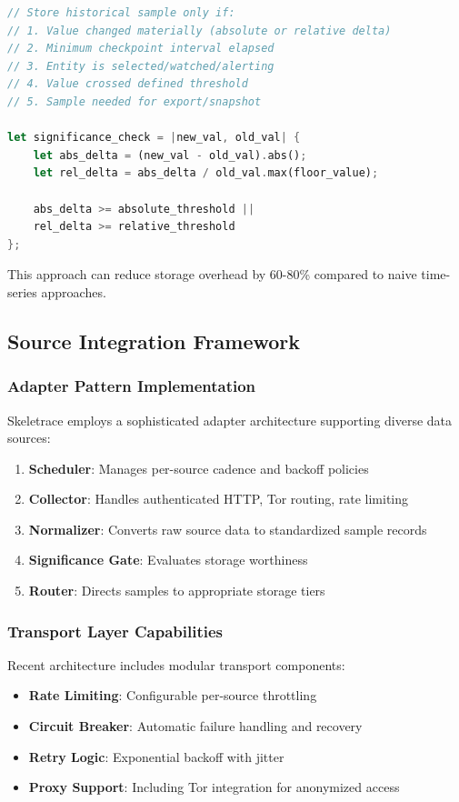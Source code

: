 \documentclass[12pt,a4paper]{article}
\begin{document}
\begin{lstlisting}[language=Rust,caption=Significance Evaluation Logic]
// Store historical sample only if:
// 1. Value changed materially (absolute or relative delta)
// 2. Minimum checkpoint interval elapsed  
// 3. Entity is selected/watched/alerting
// 4. Value crossed defined threshold
// 5. Sample needed for export/snapshot

let significance_check = |new_val, old_val| {
    let abs_delta = (new_val - old_val).abs();
    let rel_delta = abs_delta / old_val.max(floor_value);
    
    abs_delta >= absolute_threshold || 
    rel_delta >= relative_threshold
};
\end{lstlisting}

This approach can reduce storage overhead by 60-80\% compared to naive time-series approaches.

\subsection{Source Integration Framework}

\subsubsection{Adapter Pattern Implementation}
Skeletrace employs a sophisticated adapter architecture supporting diverse data sources:

\begin{enumerate}
\item \textbf{Scheduler}: Manages per-source cadence and backoff policies
\item \textbf{Collector}: Handles authenticated HTTP, Tor routing, rate limiting
\item \textbf{Normalizer}: Converts raw source data to standardized sample records
\item \textbf{Significance Gate}: Evaluates storage worthiness
\item \textbf{Router}: Directs samples to appropriate storage tiers
\end{enumerate}

\subsubsection{Transport Layer Capabilities}
Recent architecture includes modular transport components:

\begin{itemize}
\item \textbf{Rate Limiting}: Configurable per-source throttling
\item \textbf{Circuit Breaker}: Automatic failure handling and recovery
\item \textbf{Retry Logic}: Exponential backoff with jitter
\item \textbf{Proxy Support}: Including Tor integration for anonymized access
\end{itemize}
\end{document}
